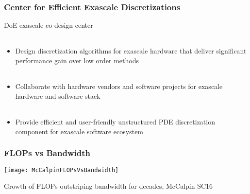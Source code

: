 \documentclass{beamer}
\begin{document}
\begin{frame}
\begin{center}
\frametitle{Center for Efficient Exascale Discretizations}

\begin{flushleft}
DoE exascale co-design center\\

~\\
\end{flushleft}

\begin{itemize}

\item Design discretization algorithms for exascale hardware that deliver significant performance gain over low order methods\\

~\\

\item Collaborate with hardware vendors and software projects for exascale hardware and software stack\\

~\\

\item Provide efficient and user-friendly unstructured PDE discretization component for exascale software ecosystem

\end{itemize}

\end{center}
\end{frame}


\begin{frame}
\begin{center}
\frametitle{FLOPs vs Bandwidth}

\texttt{[image: McCalpinFLOPsVsBandwidth]}

Growth of FLOPs outstriping bandwidth for decades, McCalpin SC16

\end{center}
\end{frame}

\end{document}
